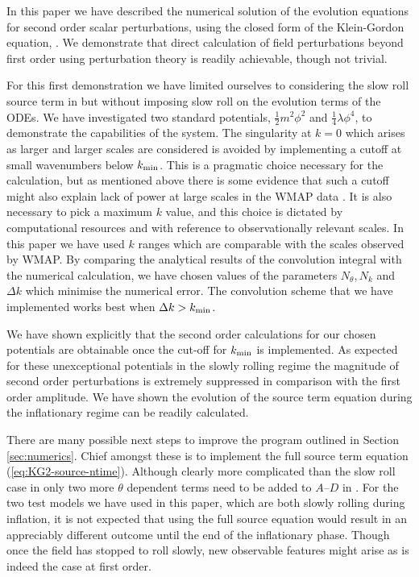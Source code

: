 In this paper we have described the numerical solution of the
evolution equations for second order scalar perturbations, using the
closed form of the Klein-Gordon equation, . We
demonstrate that direct calculation of field perturbations beyond
first order using perturbation theory is readily achievable, though
not trivial.

For this first demonstration we have limited ourselves to considering
the slow roll source term in  but without imposing
slow roll on the evolution terms of the ODEs. We have investigated two
standard potentials, $\frac{1}{2}m^2\phi^2$ and
$\frac{1}{4}\lambda\phi^4$, to demonstrate the capabilities of the
system. The singularity at $k=0$ which arises as larger and larger
scales are considered is avoided by implementing a cutoff at small
wavenumbers below $k_{\mathrm{min}}$. This is a pragmatic choice necessary for
the calculation, but as mentioned above there is some evidence that
such a cutoff might also explain lack of power at large scales in the
WMAP data \cite{spergel, Sinha:2005mn, Kim:2009pf}. It is also necessary to
pick a maximum $k$ value, and this choice is dictated by computational
resources and with reference to observationally relevant scales. In
this paper we have used $k$ ranges which are comparable with the
scales observed by WMAP. By comparing the analytical results of the
convolution integral with the numerical calculation, we have chosen
values of the parameters $N_\theta, N_k$ and $\Delta k$ which minimise
the numerical error. The convolution scheme that we have implemented
works best when $\Delta k>k_{\mathrm{min}}$.


We have shown explicitly that the second order calculations for our chosen
potentials are obtainable once the cut-off for $k_{\mathrm{min}}$ is
implemented. As expected for these unexceptional potentials in the slowly
rolling regime the magnitude of second order perturbations is extremely
suppressed in comparison with the first order amplitude. We have shown the
evolution of the source term equation during the inflationary regime can be
readily calculated.


There are many possible next steps to improve the program outlined in
Section \ref{sec:numerics}. Chief amongst these is to implement the
full source term equation (\ref{eq:KG2-source-ntime}). Although clearly
more complicated than the slow roll case in 
only two more $\theta$ dependent terms need to be added to $A$--$D$ in
.  For the two test models we have used in this paper, which
are both slowly rolling during inflation, it is not expected that
using the full source equation would result in an appreciably
different outcome until the end of the inflationary phase. Though once
the field has stopped to roll slowly, new observable features might
arise as is indeed the case at first order. 



